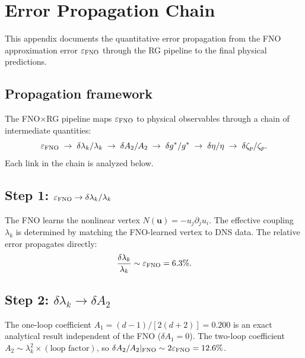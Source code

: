 \section{Error Propagation Chain\label{app:error_prop}}

This appendix documents the quantitative error propagation from the FNO approximation error $\varepsilon_{\text{FNO}}$ through the RG pipeline to the final physical predictions.

\subsection{Propagation framework}

The FNO$\times$RG pipeline maps $\varepsilon_{\text{FNO}}$ to physical observables through a chain of intermediate quantities:
\begin{equation}
\varepsilon_{\text{FNO}} \;\to\; \delta\lambda_k/\lambda_k \;\to\; \delta A_2/A_2 \;\to\; \delta g^*/g^* \;\to\; \delta\eta/\eta \;\to\; \delta\zeta_p/\zeta_p.
\end{equation}
Each link in the chain is analyzed below.

\subsection{Step 1: $\varepsilon_{\text{FNO}} \to \delta\lambda_k/\lambda_k$}

The FNO learns the nonlinear vertex $N(\mathbf{u}) = -u_j\partial_j u_i$. The effective coupling $\lambda_k$ is determined by matching the FNO-learned vertex to DNS data. The relative error propagates directly:
\begin{equation}
\frac{\delta\lambda_k}{\lambda_k} \sim \varepsilon_{\text{FNO}} = 6.3\%.
\end{equation}

\subsection{Step 2: $\delta\lambda_k \to \delta A_2$}

The one-loop coefficient $A_1 = (d-1)/[2(d+2)] = 0.200$ is an exact analytical result independent of the FNO ($\delta A_1 = 0$). The two-loop coefficient $A_2 \sim \lambda_k^2 \times (\text{loop factor})$, so $\delta A_2/A_2|_{\text{FNO}} \sim 2\varepsilon_{\text{FNO}} = 12.6\%$.

